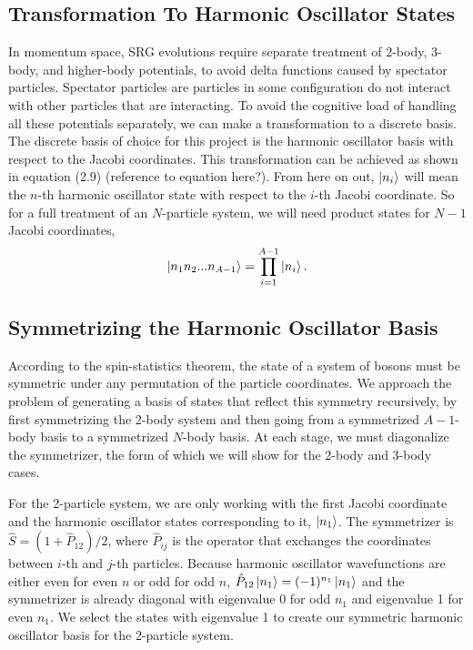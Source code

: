 \subsection{Transformation To Harmonic Oscillator States}

In momentum space, SRG evolutions require separate treatment of 2-body, 3-body, and higher-body potentials, to avoid delta functions caused by spectator particles. Spectator particles are particles in some configuration do not interact with other particles that are interacting. To avoid the cognitive load of handling all these potentials separately, we can make a transformation to a discrete basis. The discrete basis of choice for this project is the harmonic oscillator basis with respect to the Jacobi coordinates. This transformation can be achieved as shown in equation (2.9) (reference to equation here?). From here on out, $\ket{n_i}$ will mean the $n$-th harmonic oscillator state with respect to the $i$-th Jacobi coordinate. So for a full treatment of an $N$-particle system, we will need product states for $N-1$ Jacobi coordinates,
\begin{equation}
\ket{n_1 n_2 ... n_{A-1}} = \prod_{i=1}^{A-1}\ket{n_i}.
\end{equation}

\subsection{Symmetrizing the Harmonic Oscillator Basis}

According to the spin-statistics theorem, the state of a system of bosons must be symmetric under any permutation of the particle coordinates. We approach the problem of generating a basis of states that reflect this symmetry recursively, by first symmetrizing the 2-body system and then going from a symmetrized $A-1$-body basis to a symmetrized $N$-body basis. At each stage, we must diagonalize the symmetrizer, the form of which we will show for the 2-body and 3-body cases.

For the 2-particle system, we are only working with the first Jacobi coordinate and the harmonic oscillator states corresponding to it, $\ket{n_1}$. The symmetrizer is $\hat{S} = (1 + \hat{P}_{12})/2$, where $\hat{P}_{ij}$ is the operator that exchanges the coordinates between $i$-th and $j$-th particles. Because harmonic oscillator wavefunctions are either even for even $n$ or odd for odd $n$, $\hat{P}_{12} \ket{n_1} = (-1)^{n_1} \ket{n_1}$ and the symmetrizer is already diagonal with eigenvalue 0 for odd $n_1$ and eigenvalue 1 for even $n_1$. We select the states with eigenvalue 1 to create our symmetric harmonic oscillator basis for the 2-particle system.

